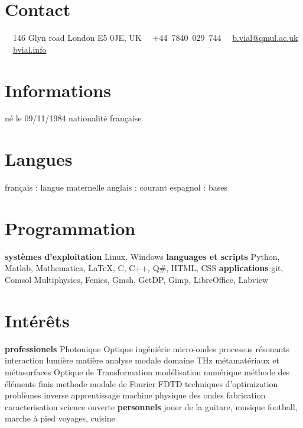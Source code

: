 \documentclass{cv}
\begin{document}


\begin{aside} %
	\section{Contact}
	\faHome~~146 Glyn road
	London E5 0JE, UK
	\faPhone~~+44~7840~029~744
	\faEnvelope~~\href{mailto:b.vial@qmul.ac.uk}{b.vial@qmul.ac.uk}
	\faUser~~\href{http://bvial.info/}{bvial.info}
	\section{Informations}
	né le 09/11/1984
	nationalité française
	\section{Langues}
	français : langue maternelle
	anglais : courant
	espagnol : bases
	\section{Programmation}
	\textbf{systèmes d'exploitation}
	Linux, Windows
	\textbf{languages et scripts}
	Python, Matlab, Mathematica, \LaTeX, C, C++, Q\#, HTML, CSS
	\textbf{applications}
	git, Comsol Multiphysics, Fenics, Gmsh, GetDP, Gimp, LibreOffice, Labview
	\section{Intérêts}
	\textbf{professionels}
	Photonique
	Optique
	ingéniérie micro-ondes
	processus résonants
	interaction lumière matière
	analyse modale
	domaine THz
	métamatériaux et métasurfaces
	Optique de Transformation
	modélisation numérique
	méthode des éléments finis
	methode modale de Fourier
	FDTD
	techniques d'optimization
	problèmes inverse
	apprentissage machine
	physique des ondes
	fabrication
	caracterisation
	science ouverte
	\textbf{personnels}
	jouer de la guitare, musique
	football, marche à pied
	voyages, cuisine
\end{aside}


\end{document}
